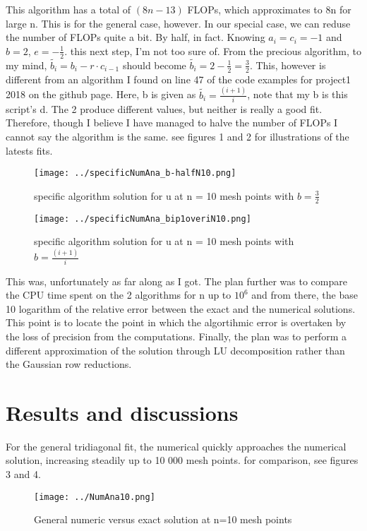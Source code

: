 \documentclass[10pt, twocolumn]{revtex4-1}
\begin{document}
This algorithm has a total of $(8n-13)$ FLOPs, which approximates to 8n for large n. This is for the general case, however. In our special case, we can reduse the number of FLOPs quite a bit. By half, in fact. 
Knowing $a_i = c_{i} = -1$ and $b=2$, $e = -\frac{1}{2}$. this next step, I'm not too sure of. From the precious algorithm, to my mind, $\tilde{b_{i}} = b_{i} - r \cdot c_{i-1}$ should become $\tilde{b_i}=2-\frac{1}{2}=\frac{3}{2}$. This, however is different from an algorithm I found on line 47 of the code examples for project1 2018 on the github page. Here, b is given as $\tilde{b_i} = \frac{(i+1)}{i}$, note that my b is this script's d. The 2 produce different values, but neither is really a good fit. Therefore, though I believe I have managed to halve the number of FLOPs I cannot say the algorithm is the same. see figures 1 and 2 for illustrations of the latests fits.

\begin{figure}[hbtp]
\texttt{[image: ../specificNumAna\_b-halfN10.png]}
\caption{specific algorithm solution for u at n = 10 mesh points with $b=\frac{3}{2}$} 
\end{figure}

\begin{figure}[hbtp]
\texttt{[image: ../specificNumAna\_bip1overiN10.png]}
\caption{specific algorithm solution for u at n = 10 mesh points with $b=\frac{(i+1)}{i}$} 
\end{figure}
This was, unfortunately as far along as I got. The plan further was to compare the CPU time spent on the 2 algorithms for n up to $10^6$ and from there, the base 10 logarithm of the relative error between the exact and the numerical solutions. This point is to locate the point in which the algortihmic error is overtaken by the loss of precision from the computations. Finally, the plan was to perform a different approximation of the solution through LU decomposition rather than the Gaussian row reductions. 

\section{Results and discussions}
For the general tridiagonal fit, the numerical quickly approaches the numerical solution, increasing steadily up to 10 000 mesh points. for comparison, see figures 3 and 4.
\begin{figure}[hbtp]
\texttt{[image: ../NumAna10.png]}
\caption{General numeric versus exact solution at n=10 mesh points} 
\end{figure}
\end{document}
